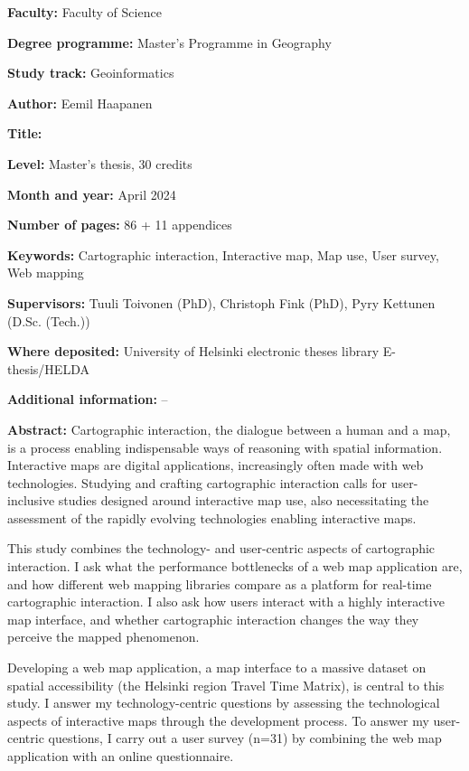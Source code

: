\begin{spacing}{1}
\setlength{\parskip}{4pt}

\textbf{Faculty:} Faculty of Science

\textbf{Degree programme:} Master's Programme in Geography

\textbf{Study track:} Geoinformatics

\textbf{Author:} Eemil Haapanen

\textbf{Title:} \mytitle

\textbf{Level:} Master's thesis, 30 credits

\textbf{Month and year:} April 2024  %

\textbf{Number of pages:} 86 + 11 appendices  %

\textbf{Keywords:} Cartographic interaction, Interactive map, Map use, User survey, Web mapping

\textbf{Supervisors:} Tuuli Toivonen (PhD), Christoph Fink (PhD), Pyry Kettunen (D.Sc. (Tech.))

\textbf{Where deposited:} University of Helsinki electronic theses library E-thesis/HELDA

\textbf{Additional information:} --

\textbf{Abstract:} Cartographic interaction, the dialogue between a human and a map, is
a process enabling indispensable ways of reasoning with spatial information.
Interactive maps are digital applications,
increasingly often made with web technologies.
Studying and crafting cartographic interaction calls for
user-inclusive studies designed around interactive map use,
also necessitating the assessment of the rapidly evolving technologies enabling interactive maps.

This study combines the technology- and user-centric aspects of cartographic interaction.
I ask what the performance bottlenecks of a web map application are,
and how different web mapping libraries compare as a platform for real-time cartographic interaction.
I also ask how users interact with a highly interactive map interface,
and whether cartographic interaction changes the way they perceive the mapped phenomenon.

Developing a web map application,
a map interface to a massive dataset on spatial accessibility (the Helsinki region Travel Time Matrix),
is central to this study.
I answer my technology-centric questions by assessing the technological aspects of interactive maps
through the development process.
To answer my user-centric questions,
I carry out a user survey (n=31) by combining the web map application with an online questionnaire.


\end{spacing}
